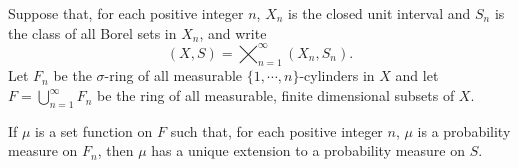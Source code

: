 Suppose that, for each positive integer $n$, $X_n$ is the closed unit interval and $S_n$ is the class of all Borel sets in $X_n$, and write
$$(X, S) = \bigtimes_{n=1}^{\infty}(X_n, S_n).$$
Let $F_n$ be the $\sigma$-ring of all measurable $\{1, \cdots, n\}$-cylinders in $X$ and let $F = \bigcup_{n=1}^{\infty} F_n$ be the ring of all measurable, finite dimensional subsets of $X$.

If $\mu$ is a set function on $F$ such that, for each positive integer $n$, $\mu$ is a probability measure on $F_n$, then $\mu$ has a unique extension to a probability measure on $S$.

